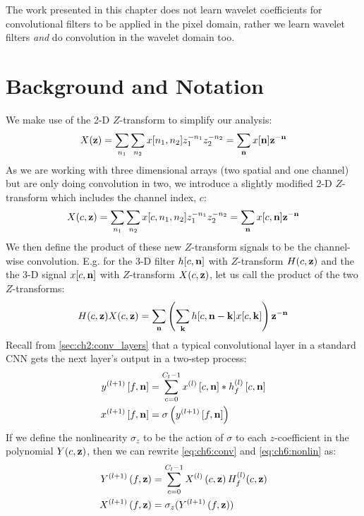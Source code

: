 The work presented in this chapter does not learn wavelet coefficients 
for convolutional filters to be applied in the pixel domain, rather we learn wavelet filters 
\emph{and} do convolution in the wavelet domain too.

\section{Background and Notation}
We make use of the 2-D $Z$-transform to simplify our analysis:
%
\begin{equation}
  X(\mathbf{z}) = \sum_{n_1}\sum_{n_2} x[n_1, n_2]z_1^{-n_1}z_2^{-n_2} =
  \sum_{\mathbf{n}}x[\mathbf{n}]\mathbf{z}^{-\mathbf{n}}
\end{equation}
%
As we are working with three dimensional arrays (two spatial and one channel) but are
only doing convolution in two, we introduce a slightly modified 2-D $Z$-transform
which includes the channel index, $c$:
%
\begin{equation}
  X(c, \mathbf{z}) = \sum_{n_1}\sum_{n_2} x[c, n_1, n_2]z_1^{-n_1}z_2^{-n_2} =
  \sum_{\mathbf{n}}x[c, \mathbf{n}]\mathbf{z}^{-\mathbf{n}} \label{eq:ch6:ztransform}
\end{equation}
We then define the product of these new $Z$-transform signals to be the
channel-wise convolution. E.g. for the 3-D filter $h[c, \mathbf{n}]$ with $Z$-transform
$H(c, \mathbf{z})$ and the the 3-D signal $x[c, \mathbf{n}]$ with $Z$-transform $X(c, \mathbf{z})$,
let us call the product of the two $Z$-transforms:
\begin{equation}
  H(c, \mathbf{z})X(c, \mathbf{z}) = \sum_{\mathbf{n}}\left(\sum_{\mathbf{k}}h[c, \mathbf{n}-\mathbf{k}]x[c, \mathbf{k}]\right)\mathbf{z}^{-\mathbf{n}} \label{eq:ch6:zproduct}
\end{equation}
%
Recall from \autoref{sec:ch2:conv_layers} that a typical convolutional
layer in a standard CNN gets the next layer's output in a two-step process:
%
\begin{align} 
  y^{(l+1)}\left[f, \mathbf{n}\right] &= \sum_{c=0}^{C_l - 1} x^{(l)}\left[c, \mathbf{n}\right] \ast h^{(l)}_{f}\left[c, \mathbf{n} \right]
    \label{eq:ch6:conv}\\
    x^{(l+1)}\left[f, \mathbf{n}\right] & =  \sigma \left( y^{(l+1)}\left[f, \mathbf{n}\right] \right) \label{eq:ch6:nonlin}
\end{align}
%
If we define the nonlinearity $\sigma_z$ to be the action of $\sigma$ to each
$z$-coefficient in the polynomial $Y(c, \mathbf{z})$, then we can rewrite
\eqref{eq:ch6:conv} and \eqref{eq:ch6:nonlin} as:
%
\begin{align}
  Y^{(l+1)}\left(f, \mathbf{z}\right) &= \sum_{c=0}^{C_l - 1} X^{(l)}\left(c, \mathbf{z}\right) H_f^{(l)}(c, \mathbf{z}) \\
  X^{(l+1)}\left(f, \mathbf{z}\right) &= \sigma_z(Y^{(l+1)}\left(f, \mathbf{z}\right))
\end{align}
%
